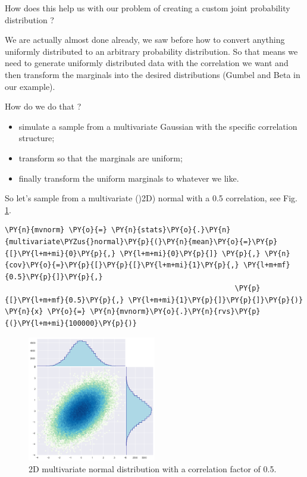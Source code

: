 How does this help us with our problem of creating a custom joint
probability distribution ?

We are actually almost done already, we saw before how to convert
anything uniformly distributed to an arbitrary probability distribution.
So that means we need to generate uniformly distributed data with the
correlation we want and then transform the marginals into the desired
distributions (Gumbel and Beta in our example).

How do we do that ?

\begin{itemize}
\tightlist
\item
  simulate a sample from a multivariate Gaussian with the specific correlation
  structure;
\item
  transform so that the marginals are uniform;
\item
  finally transform the uniform marginals to whatever we like.
\end{itemize}

So let's sample from a multivariate ()2D) normal with a 0.5 correlation, 
see Fig.~ \ref{fig:multivariate_with_correlation}.

\begin{tcolorbox}[breakable, size=fbox, boxrule=1pt, pad at break*=1mm,colback=cellbackground, colframe=cellborder]
\begin{Verbatim}[commandchars=\\\{\}]
\PY{n}{mvnorm} \PY{o}{=} \PY{n}{stats}\PY{o}{.}\PY{n}{multivariate\PYZus{}normal}\PY{p}{(}\PY{n}{mean}\PY{o}{=}\PY{p}{[}\PY{l+m+mi}{0}\PY{p}{,} \PY{l+m+mi}{0}\PY{p}{]} \PY{p}{,} \PY{n}{cov}\PY{o}{=}\PY{p}{[}\PY{p}{[}\PY{l+m+mi}{1}\PY{p}{,} \PY{l+m+mf}{0.5}\PY{p}{]}\PY{p}{,}
                                                      \PY{p}{[}\PY{l+m+mf}{0.5}\PY{p}{,} \PY{l+m+mi}{1}\PY{p}{]}\PY{p}{]}\PY{p}{)}
\PY{n}{x} \PY{o}{=} \PY{n}{mvnorm}\PY{o}{.}\PY{n}{rvs}\PY{p}{(}\PY{l+m+mi}{100000}\PY{p}{)}
\end{Verbatim}
\end{tcolorbox}

\begin{figure}[htb]
  \centering
  \includegraphics[width=0.5\textwidth]{copula_files/copula_15_0.png}
  \caption{2D multivariate normal distribution with a correlation factor of 0.5.}
  \label{fig:multivariate_with_correlation}
\end{figure}
    
